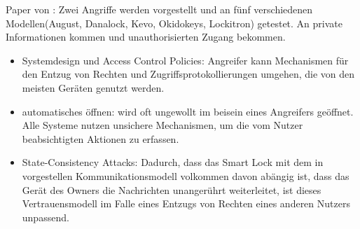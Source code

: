	Paper von \citeauthor{Ho2016}:
	Zwei Angriffe werden vorgestellt und an fünf verschiedenen Modellen(August, Danalock, Kevo, Okidokeys, Lockitron) getestet.
	An private Informationen kommen und unauthorisierten Zugang bekommen.
	\begin{itemize}
	    \item Systemdesign und Access Control Policies: Angreifer kann Mechanismen für den Entzug von Rechten und Zugriffsprotokollierungen umgehen, die von den meisten Geräten genutzt werden.
	    \item automatisches öffnen: wird oft ungewollt im beisein eines Angreifers geöffnet. 
	        Alle Systeme nutzen unsichere Mechanismen, um die vom Nutzer beabsichtigten Aktionen zu erfassen.
        \item State-Consistency Attacks: Dadurch, dass das Smart Lock mit dem in  vorgestellen Kommunikationsmodell volkommen davon abängig ist, dass das Gerät des Owners die Nachrichten unangerührt weiterleitet, ist dieses Vertrauensmodell im Falle eines Entzugs von Rechten eines anderen Nutzers unpassend.
        

\end{itemize}
